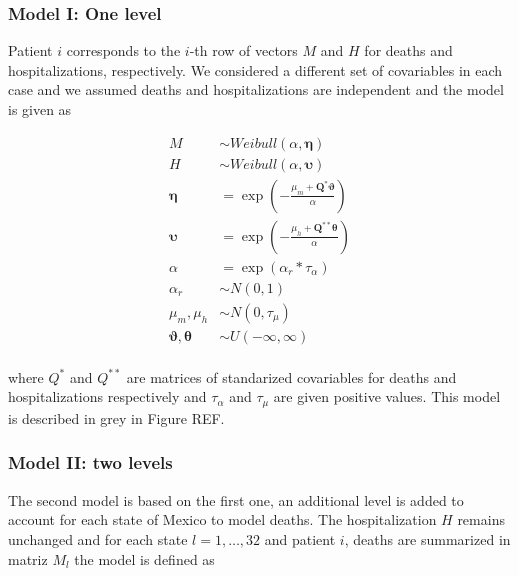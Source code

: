 \documentclass[10pt,letterpaper]{article}
\begin{document}
\subsubsection{Model I: One level}\label{model-i-one-level}

Patient \(i\) corresponds to the \(i\)-th row of vectors \(M\) and \(H\)
for deaths and hospitalizations, respectively. We considered a different
set of covariables in each case and we assumed deaths and
hospitalizations are independent and the model is given as

\[
\begin{aligned}
 {M}  &\sim Weibull(\alpha,\mathbf{\eta})\\
 {H}  &\sim Weibull(\alpha,\mathbf{\upsilon}) \\
 \mathbf{\eta} &= \exp\left(-\frac{\mu_m+\mathbf{Q}^*\mathbf{\vartheta}}{\alpha}\right) \\
 \mathbf{\upsilon} &= \exp\left(-\frac{\mu_h+\mathbf{Q}^{**}\mathbf{\theta}}{\alpha}\right) \\
 \alpha&=\exp(\alpha_r*\tau_\alpha) \\
 \alpha_r&\sim N(0,1) \\
 \mu_m,\mu_h &\sim N(0,\tau_\mu) \\
 \mathbf{\vartheta},\mathbf{\theta} &\sim U(-\infty,\infty) \\
\end{aligned}
\]

where \(Q^*\) and \(Q^{**}\) are matrices of standarized covariables for
deaths and hospitalizations respectively and \(\tau_\alpha\) and
\(\tau_{\mu}\) are given positive values. This model is described in
grey in Figure REF.

\subsubsection{Model II: two levels}\label{model-ii-two-levels}

The second model is based on the first one, an additional level is added
to account for each state of Mexico to model deaths. The hospitalization
\(H\) remains unchanged and for each state \(l= 1,\ldots, 32\) and
patient \(i\), deaths are summarized in matriz \(M_{l}\) the model is
defined as
\end{document}
